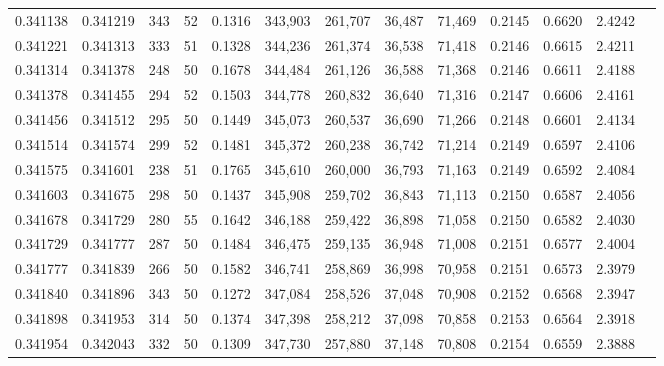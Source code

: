 \begin{tabular}{rrrrrrrrrrrrr}
0.341138 & 0.341219 &   343 &  52 &                                     0.1316 & 343,903 & 261,707 &  36,487 &  71,469 & 0.2145 & 0.6620 & 2.4242 \\
0.341221 & 0.341313 &   333 &  51 &                                     0.1328 & 344,236 & 261,374 &  36,538 &  71,418 & 0.2146 & 0.6615 & 2.4211 \\
0.341314 & 0.341378 &   248 &  50 &                                     0.1678 & 344,484 & 261,126 &  36,588 &  71,368 & 0.2146 & 0.6611 & 2.4188 \\
0.341378 & 0.341455 &   294 &  52 &                                     0.1503 & 344,778 & 260,832 &  36,640 &  71,316 & 0.2147 & 0.6606 & 2.4161 \\
0.341456 & 0.341512 &   295 &  50 &                                     0.1449 & 345,073 & 260,537 &  36,690 &  71,266 & 0.2148 & 0.6601 & 2.4134 \\
0.341514 & 0.341574 &   299 &  52 &                                     0.1481 & 345,372 & 260,238 &  36,742 &  71,214 & 0.2149 & 0.6597 & 2.4106 \\
0.341575 & 0.341601 &   238 &  51 &                                     0.1765 & 345,610 & 260,000 &  36,793 &  71,163 & 0.2149 & 0.6592 & 2.4084 \\
0.341603 & 0.341675 &   298 &  50 &                                     0.1437 & 345,908 & 259,702 &  36,843 &  71,113 & 0.2150 & 0.6587 & 2.4056 \\
0.341678 & 0.341729 &   280 &  55 &                                     0.1642 & 346,188 & 259,422 &  36,898 &  71,058 & 0.2150 & 0.6582 & 2.4030 \\
0.341729 & 0.341777 &   287 &  50 &                                     0.1484 & 346,475 & 259,135 &  36,948 &  71,008 & 0.2151 & 0.6577 & 2.4004 \\
0.341777 & 0.341839 &   266 &  50 &                                     0.1582 & 346,741 & 258,869 &  36,998 &  70,958 & 0.2151 & 0.6573 & 2.3979 \\
0.341840 & 0.341896 &   343 &  50 &                                     0.1272 & 347,084 & 258,526 &  37,048 &  70,908 & 0.2152 & 0.6568 & 2.3947 \\
0.341898 & 0.341953 &   314 &  50 &                                     0.1374 & 347,398 & 258,212 &  37,098 &  70,858 & 0.2153 & 0.6564 & 2.3918 \\
0.341954 & 0.342043 &   332 &  50 &                                     0.1309 & 347,730 & 257,880 &  37,148 &  70,808 & 0.2154 & 0.6559 & 2.3888 \\

\end{tabular}
